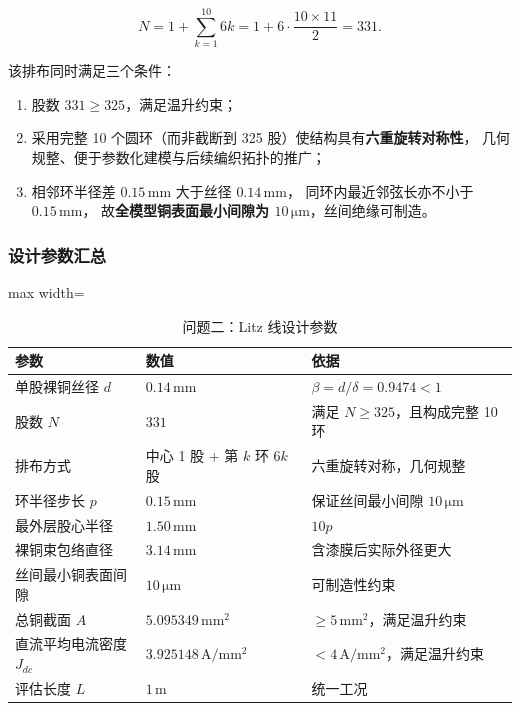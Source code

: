 \documentclass[12pt, a4paper]{ctexart}
\newcommand{\U}[1]{\ensuremath{\,\mathrm{#1}}}
\begin{document}
\begin{equation}
N = 1 + \sum_{k=1}^{10} 6k = 1 + 6\cdot\frac{10\times11}{2} = 331 .
\label{eq:N331}
\end{equation}

该排布同时满足三个条件：
\begin{enumerate}[label=(\alph*), leftmargin=2.2em, itemsep=2pt]
\item 股数 $331 \ge 325$，满足温升约束；
\item 采用完整 10 个圆环（而非截断到 325 股）使结构具有\textbf{六重旋转对称性}，
几何规整、便于参数化建模与后续编织拓扑的推广；
\item 相邻环半径差 $0.15\U{mm}$ 大于丝径 $0.14\U{mm}$，
同环内最近邻弦长亦不小于 $0.15\U{mm}$，
故\textbf{全模型铜表面最小间隙为 $10\U{\mu m}$}，丝间绝缘可制造。
\end{enumerate}

\subsubsection{设计参数汇总}

\begin{table}[H]
\centering
\caption{问题二：Litz 线设计参数}
\label{tab:q2-design}
\small
\begin{adjustbox}{max width=\textwidth}
\begin{tabular}{l l l}
\toprule
\textbf{参数} & \textbf{数值} & \textbf{依据} \\
\midrule
单股裸铜丝径 $d$            & $0.14\U{mm}$            & $\beta = d/\delta = 0.9474 < 1$ \\
股数 $N$                    & $331$                      & 满足 $N\ge325$，且构成完整 10 环 \\
排布方式                    & 中心 1 股 + 第 $k$ 环 $6k$ 股 & 六重旋转对称，几何规整 \\
环半径步长 $p$              & $0.15\U{mm}$            & 保证丝间最小间隙 $10\U{\mu m}$ \\
最外层股心半径              & $1.50\U{mm}$            & $10p$ \\
裸铜束包络直径              & $3.14\U{mm}$            & 含漆膜后实际外径更大 \\
丝间最小铜表面间隙          & $10\U{\mu m}$           & 可制造性约束 \\
总铜截面 $A$                & $5.095349\U{mm^2}$      & $\ge 5\U{mm^2}$，满足温升约束 \\
直流平均电流密度 $J_{dc}$   & $3.925148\U{A/mm^2}$    & $< 4\U{A/mm^2}$，满足温升约束 \\
评估长度 $L$                & $1\U{m}$                & 统一工况 \\
\bottomrule
\end{tabular}
\end{adjustbox}
\end{table}
\end{document}
